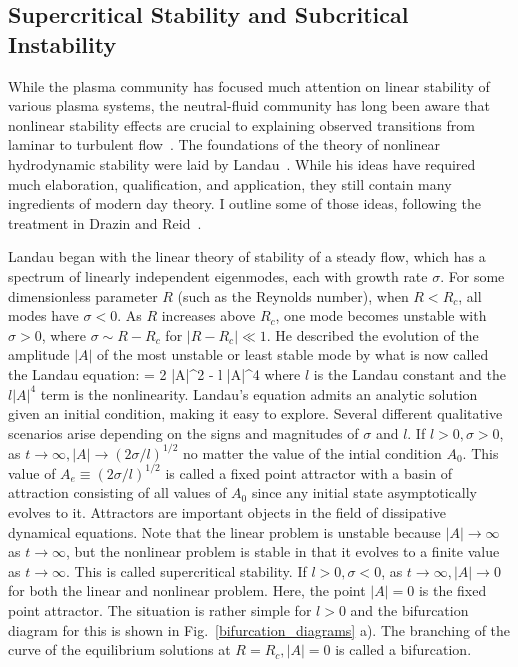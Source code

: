 \subsection{Supercritical Stability and Subcritical Instability}
\label{subcritcal_supercritical}

While the plasma community has focused much attention on linear stability of various plasma systems, the neutral-fluid 
community has long been aware that nonlinear stability effects are crucial to explaining observed transitions from laminar to turbulent flow~\cite{krommes1999}.
The foundations of the theory of nonlinear hydrodynamic stability were laid by Landau~\cite{landau1944,landau1959}. While his ideas have required much elaboration, qualification, and application,
they still contain many ingredients of modern day theory. I outline some of those ideas, following the treatment in Drazin and Reid~\cite{drazin1981}.

Landau began with the linear theory of stability of a steady flow, which has a spectrum of linearly independent eigenmodes, each with growth rate $\sigma$. For some dimensionless parameter $R$ 
(such as the Reynolds number), when $R < R_c$, all modes have $\sigma < 0$. As $R$ increases above $R_c$, one mode becomes unstable with $\sigma > 0$, where 
$\sigma \sim R - R_c$ for $|R-R_c| \ll 1$.
He described the evolution of the amplitude $|A|$ of the most unstable or least stable mode by what is now called the Landau equation:
\beq
\label{landau_eqn}
 = 2 \sigma |A|^2 - l |A|^4
\eeq
where $l$ is the Landau constant and the $l |A|^4$ term is the nonlinearity. Landau's equation admits an analytic solution given an initial condition, making it easy to explore. 
Several different qualitative scenarios arise depending on the signs and magnitudes of $\sigma$ and $l$. If $l>0, \sigma>0$, as $t \rightarrow \infty, |A| \rightarrow (2 \sigma/l)^{1/2}$ no matter
the value of the intial condition $A_0$. This value of $A_e \equiv (2 \sigma/l)^{1/2}$ is called a fixed point attractor with a basin of attraction consisting of all values of $A_0$
since any initial state asymptotically evolves to it. Attractors are important objects in the field of dissipative dynamical equations. Note that the linear problem
is unstable because $|A| \rightarrow \infty$ as $t \rightarrow \infty$, but the nonlinear problem is stable in that it evolves to a finite value as $t \rightarrow \infty$. This is called
supercritical stability. If $l>0, \sigma<0$, as $t \rightarrow \infty, |A| \rightarrow 0$ for both the linear and nonlinear problem. Here, the point $|A|=0$ is the fixed point attractor. 
The situation is rather simple for
$l>0$ and the bifurcation diagram for this is shown in Fig.~\ref{bifurcation_diagrams} a). The branching of the curve of the equilibrium solutions at $R = R_c, |A| = 0$ is called a bifurcation.

